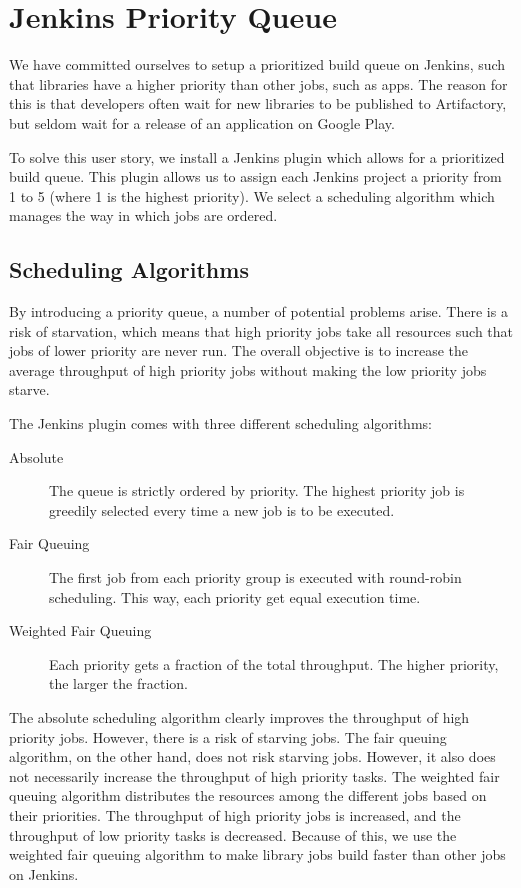 \chapter{Jenkins Priority Queue}
We have committed ourselves to setup a prioritized build queue on Jenkins, such that libraries have a higher priority than other jobs, such as apps. The reason for this is that developers often wait for new libraries to be published to Artifactory, but seldom wait for a release of an application on Google Play.

To solve this user story, we install a Jenkins plugin \parencite{jenkins-priority-plugin} which allows for a prioritized build queue. This plugin allows us to assign each Jenkins project a priority from 1 to 5 (where 1 is the highest priority). We select a scheduling algorithm which manages the way in which jobs are ordered.

\section{Scheduling Algorithms}
By introducing a priority queue, a number of potential problems arise. There is a risk of starvation, which means that high priority jobs take all resources such that jobs of lower priority are never run. The overall objective is to increase the average throughput of high priority jobs without making the low priority jobs starve.

The Jenkins plugin comes with three different scheduling algorithms:

\begin{description}
  \item[Absolute] The queue is strictly ordered by priority. The highest priority job is greedily selected every time a new job is to be executed.
  \item[Fair Queuing] The first job from each priority group is executed with round-robin scheduling. This way, each priority get equal execution time.
  \item[Weighted Fair Queuing] Each priority gets a fraction of the total throughput. The higher priority, the larger the fraction. 
\end{description}

The absolute scheduling algorithm clearly improves the throughput of high priority jobs. However, there is a risk of starving jobs. The fair queuing algorithm, on the other hand, does not risk starving jobs. However, it also does not necessarily increase the throughput of high priority tasks. The weighted fair queuing algorithm distributes the resources among the different jobs based on their priorities. The throughput of high priority jobs is increased, and the throughput of low priority tasks is decreased. Because of this, we use the weighted fair queuing algorithm to make library jobs build faster than other jobs on Jenkins.
